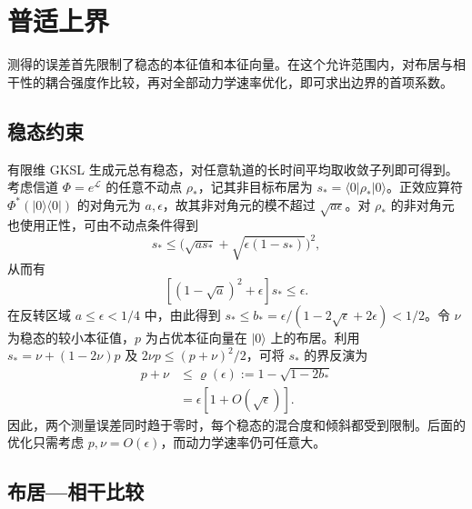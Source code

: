 \documentclass[aps,pra,reprint,amsmath,amssymb,nofootinbib,floatfix,longbibliography]{revtex4-2}
\theoremstyle{aps}
\newcommand{\eps}{\epsilon}
\newcommand{\ket}[1]{|#1\rangle}
\newcommand{\bra}[1]{\langle#1|}
\newcommand{\proj}[1]{|#1\rangle\langle#1|}
\begin{document}
\section{普适上界}\label{sec:universal}

测得的误差首先限制了稳态的本征值和本征向量。在这个允许范围内，对布居与相干性的耦合强度作比较，再对全部动力学速率优化，即可求出边界的首项系数。

\subsection{稳态约束}

有限维 GKSL 生成元总有稳态，对任意轨道的长时间平均取收敛子列即可得到。考虑信道 $\Phi=e^{\mathcal L}$ 的任意不动点 $\rho_*$，记其非目标布居为 $s_*=\bra0\rho_*\ket0$。正效应算符 $\Phi^*(\proj0)$ 的对角元为 $a,\eps$，故其非对角元的模不超过 $\sqrt{a\eps}$。对 $\rho_*$ 的非对角元也使用正性，可由不动点条件得到
\[
 s_*\le\bigl(\sqrt{as_*}+\sqrt{\eps(1-s_*)}\bigr)^2,
\]
从而有
\begin{equation}\label{eq:budget-cross}
 [(1-\sqrt a)^2+\eps]s_*\le\eps.
\end{equation}
在反转区域 $a\le\eps<1/4$ 中，由此得到 $s_*\le b_*=\eps/(1-2\sqrt\eps+2\eps)<1/2$。令 $\nu$ 为稳态的较小本征值，$p$ 为占优本征向量在 $\ket0$ 上的布居。利用 $s_*=\nu+(1-2\nu)p$ 及 $2\nu p\le(p+\nu)^2/2$，可将 $s_*$ 的界反演为
\begin{equation}\label{eq:budget-leading}
 \begin{aligned}
 p+\nu&\le\varrho(\eps):=1-\sqrt{1-2b_*}\\
      &=\eps[1+O(\sqrt\eps)].
 \end{aligned}
\end{equation}
因此，两个测量误差同时趋于零时，每个稳态的混合度和倾斜都受到限制。后面的优化只需考虑 $p,\nu=O(\eps)$，而动力学速率仍可任意大。

\subsection{布居—相干比较}
\end{document}
